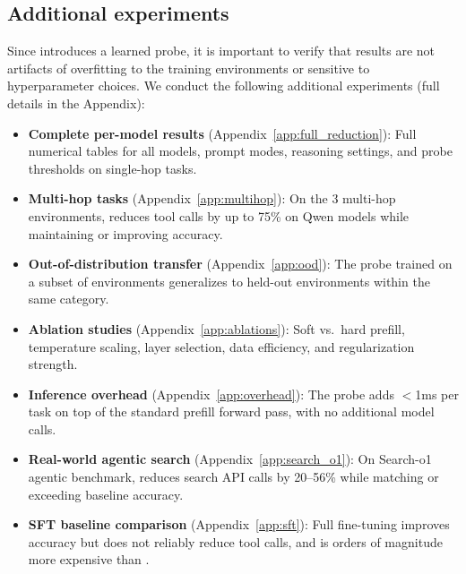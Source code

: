 \subsection{Additional experiments}

Since \method{} introduces a learned probe, it is important to verify that results are not artifacts of overfitting to the training environments or sensitive to hyperparameter choices. We conduct the following additional experiments (full details in the Appendix):
\begin{itemize}[leftmargin=*]
    \item \textbf{Complete per-model results} (Appendix~\ref{app:full_reduction}): Full numerical tables for all models, prompt modes, reasoning settings, and probe thresholds on single-hop tasks.
    \item \textbf{Multi-hop tasks} (Appendix~\ref{app:multihop}): On the 3 multi-hop environments, \method{} reduces tool calls by up to 75\% on Qwen models while maintaining or improving accuracy.
    \item \textbf{Out-of-distribution transfer} (Appendix~\ref{app:ood}): The probe trained on a subset of environments generalizes to held-out environments within the same category.
    \item \textbf{Ablation studies} (Appendix~\ref{app:ablations}): Soft vs.\ hard prefill, temperature scaling, layer selection, data efficiency, and regularization strength.
    \item \textbf{Inference overhead} (Appendix~\ref{app:overhead}): The probe adds $<$1ms per task on top of the standard prefill forward pass, with no additional model calls.
    \item \textbf{Real-world agentic search} (Appendix~\ref{app:search_o1}): On Search-o1 agentic benchmark, \method{} reduces search API calls by 20--56\% while matching or exceeding baseline accuracy.
    \item \textbf{SFT baseline comparison} (Appendix~\ref{app:sft}): Full fine-tuning improves accuracy but does not reliably reduce tool calls, and is orders of magnitude more expensive than \method{}.
\end{itemize}